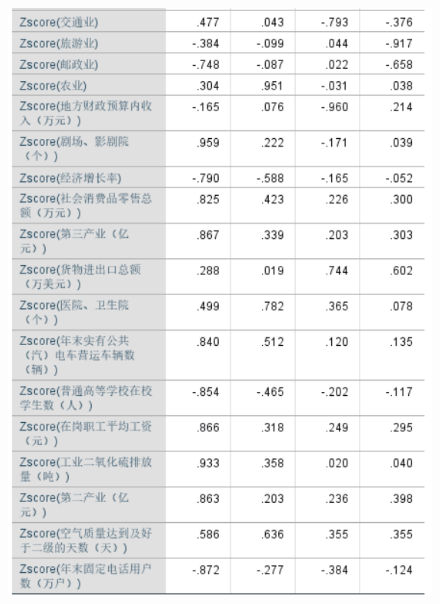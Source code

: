 \documentclass{whutmod}
\begin{document}
\begin{figure}[H]
	\centering
	\includegraphics[width=\textwidth]{figures/4.png}
	
\end{figure}
\end{document}
